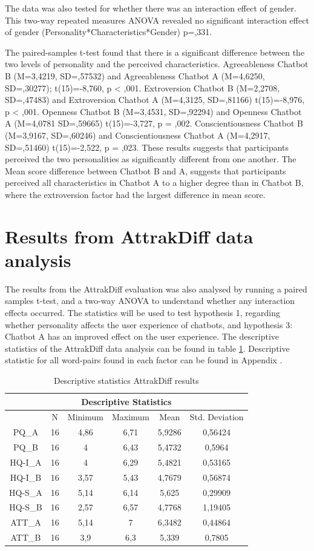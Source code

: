 The data was also tested for whether there was an interaction effect of gender. This two-way repeated measures ANOVA revealed no significant interaction effect of gender (Personality*Characteristics*Gender) p=,331.

The paired-samples t-test found that there is a significant difference between the two levels of personality and the perceived characteristics. Agreeableness Chatbot B (M=3,4219, SD=,57532) and Agreeableness Chatbot A (M=4,6250, SD=,30277); t(15)=-8,760, p < ,001. Extroversion Chatbot B (M=2,2708, SD=,47483) and Extroversion Chatbot A (M=4,3125, SD=,81166) t(15)=-8,976, p < ,001. Openness Chatbot B (M=3,4531, SD=,92294) and Openness Chatbot A (M=4,0781 SD=,59665) t(15)=-3,727, p = ,002. Conscientiousness Chatbot B (M=3,9167, SD=,60246) and Conscientiousness Chatbot A (M=4,2917, SD=,51460) t(15)=-2,522, p = ,023. These results suggests that participants perceived the two personalities as significantly different from one another. The Mean score difference between Chatbot B and A, suggests that participants perceived all characteristics in Chatbot A to a higher degree than in Chatbot B, where the extroversion factor had the largest difference in mean score.

\section{Results from AttrakDiff data analysis }
        
The results from the AttrakDiff evaluation was also analysed by running a paired samples t-test, and a two-way ANOVA to understand whether any interaction effects occurred. The statistics will be used to test hypothesis 1, regarding whether personality affects the user experience of chatbots, and hypothesis 3: Chatbot A has an improved effect on the user experience. The descriptive statistics of the AttrakDiff data analysis can be found in table \ref{table:6}. Descriptive statistic for all word-pairs found in each factor can be found in Appendix .

\begin{table}[h]
\centering
\begin{tabular}{cccccc}
\hline
\multicolumn{6}{c}{\textbf{Descriptive Statistics}} \\
\hline
& N & Minimum & Maximum & Mean & Std. Deviation \\
PQ_A & 16 & 4,86 & 6,71 & 5,9286 & 0,56424 \\
PQ_B & 16 & 4 & 6,43 & 5,4732 & 0,5964 \\
HQ-I_A & 16 & 4 & 6,29 & 5,4821 & 0,53165 \\
HQ-I_B & 16 & 3,57 & 5,43 & 4,7679 & 0,56874 \\
HQ-S_A & 16 & 5,14 & 6,14 & 5,625 & 0,29909 \\
HQ-S_B & 16 & 2,57 & 6,57 & 4,7768 & 1,19405 \\
ATT_A & 16 & 5,14 & 7 & 6,3482 & 0,44864 \\
ATT_B & 16 & 3,9 & 6,3 & 5,339 & 0,7805 \\
\end{tabular}
\caption{Descriptive statistics AttrakDiff results}
 \label{table:6}
    \end{table}

